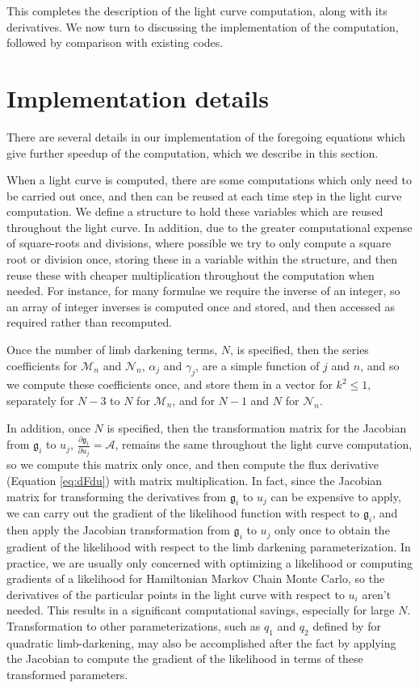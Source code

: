 \documentclass[modern]{aastex61}
\begin{document}
This completes the description of the light curve computation, along
with its derivatives.  We now turn to discussing the implementation of
the computation, followed by comparison with existing codes.

\section{Implementation details}

There are several details in our implementation of the foregoing equations
which give further speedup of the computation, which we describe in this
section.

When a light curve is computed, there are some computations which only
need to be carried out once, and then can be reused at each time step in the
light curve computation.
We define a structure to hold these variables
which are reused throughout the light curve.  In addition, due to the greater
computational expense of square-roots and divisions, where possible we try
to only compute a square root or division once, storing these in a variable
within the structure, and then reuse these with cheaper multiplication
throughout the computation when needed.  For instance, for many formulae we
require the inverse of an integer, so an array of integer inverses is computed
once and stored, and then accessed as required rather than recomputed.

Once the number of limb darkening
terms, $N$, is specified, then the series coefficients for $\mathcal{M}_n$
and $\mathcal{N}_n$, $\alpha_j$ and $\gamma_j$, are a simple function of $j$
and $n$, and so we compute these coefficients once, and store them in a vector
for $k^2 \le 1$, separately for $N-3$ to $N$ for $\mathcal{M}_n$, and for
$N-1$ and $N$ for $\mathcal{N}_n$.

In addition, once $N$ is specified, then the transformation matrix for
the Jacobian from $\mathfrak{g}_i$ to $u_j$, $\frac{\partial \mathfrak{g}_i}{\partial u_j}=\mathcal{A}$,
remains the same throughout the light curve
computation, so we compute this matrix only once, and then compute the
flux derivative (Equation \ref{eq:dFdu}) with matrix multiplication.
In fact, since the Jacobian matrix for transforming the derivatives from $\mathfrak{g}_i$
to $u_j$ can be expensive to apply, we can carry out the gradient of the
likelihood function with respect to $\mathfrak{g}_i$, and then apply the Jacobian
transformation from $\mathfrak{g}_i$ to $u_j$ only once to obtain the gradient
of the likelihood with respect to the limb darkening parameterization.
In practice, we are usually only concerned with optimizing a likelihood
or computing gradients of a likelihood for Hamiltonian Markov Chain
Monte Carlo, so the derivatives of the particular points in the
light curve with respect to $u_i$ aren't needed.  This results in a
significant computational savings, especially for large $N$.
Transformation to other parameterizations, such as $q_1$ and $q_2$
defined by \citet{Kipping2013} for quadratic limb-darkening, may also be accomplished after the
fact by applying the Jacobian to compute the gradient of the likelihood
in terms of these transformed parameters.
\end{document}
